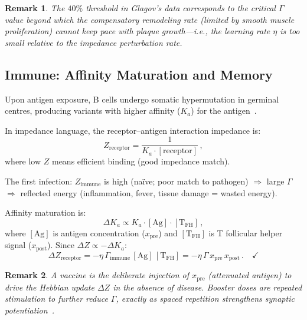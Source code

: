 \documentclass[aps,pre,twocolumn,superscriptaddress,floatfix]{revtex4-2}
\newtheorem{remark}{Remark}
\begin{document}
\begin{remark}
The $40\%$ threshold in Glagov's data corresponds to
the critical $\Gamma$ value beyond which the compensatory
remodeling rate (limited by smooth muscle proliferation)
cannot keep pace with plaque growth---i.e., the learning
rate $\eta$ is too small relative to the impedance
perturbation rate.
\end{remark}


\subsection{Immune: Affinity Maturation and Memory}
\label{sec:immune}

Upon antigen exposure, B cells undergo somatic hypermutation
in germinal centres, producing variants with higher affinity
($K_a$) for the antigen~\cite{Victora2012}.

In impedance language, the receptor--antigen interaction
impedance is:
\begin{equation}
  Z_{\text{receptor}} = \frac{1}{K_a \cdot [\text{receptor}]}\,,
\end{equation}
where low $Z$ means efficient binding (good impedance match).

The first infection: $Z_{\text{immune}}$ is high
(na\"ive; poor match to pathogen) $\Rightarrow$ large
$\Gamma$ $\Rightarrow$ reflected energy (inflammation,
fever, tissue damage = wasted energy).

Affinity maturation is:
\begin{equation}
  \Delta K_a \propto K_a \cdot [\text{Ag}] \cdot [\text{T}_{\text{FH}}]\,,
\end{equation}
where $[\text{Ag}]$ is antigen concentration
($x_{\text{pre}}$) and $[\text{T}_{\text{FH}}]$ is
T follicular helper signal ($x_{\text{post}}$).
Since $\Delta Z \propto -\Delta K_a$:
\begin{equation}
  \Delta Z_{\text{receptor}}
  = -\eta\,\Gamma_{\text{immune}}\,
    [\text{Ag}]\,[\text{T}_{\text{FH}}]
  = -\eta\,\Gamma\,x_{\text{pre}}\,x_{\text{post}}\,.
  \quad \checkmark
  \label{eq:immune-C2}
\end{equation}

\begin{remark}
A \emph{vaccine} is the deliberate injection of
$x_{\text{pre}}$ (attenuated antigen) to drive the Hebbian
update $\Delta Z$ in the absence of disease.
Booster doses are repeated stimulation to further reduce
$\Gamma$, exactly as spaced repetition strengthens synaptic
potentiation~\cite{Cepeda2006}.
\end{remark}
\end{document}

